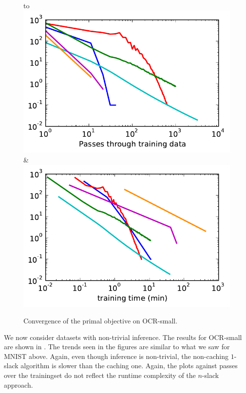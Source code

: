 \begin{figure}
    \begin{tabu} to 
    \\[-3mm]
    \includegraphics[width=\linewidth]{evaluation/images/letters_small_log}&%
    \includegraphics[width=\linewidth]{evaluation/images/letters_small_log_time}
    \end{tabu}
\caption{%
   Convergence of the primal objective on OCR-small. 
}
\end{figure}

We now consider datasets with non-trivial inference.
The results for OCR-small are shown in .
The trends seen in the figures are similar to what we saw for MNIST above.
Again, even though inference is non-trivial, the non-caching $1$-slack
algorithm is slower than the caching one. Again, the plots against passes over the trainingset
do not reflect the runtime complexity of the $n$-slack approach.


